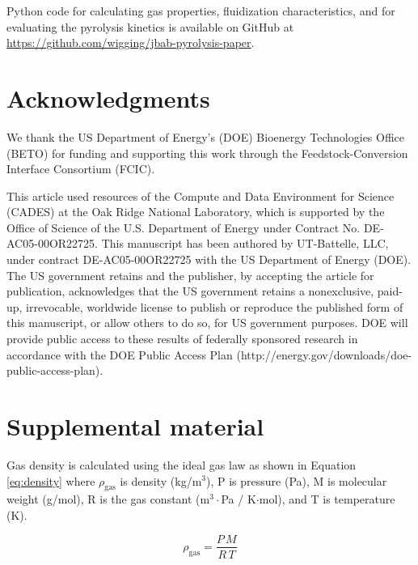 \documentclass{article}
\begin{document}
Python code for calculating gas properties, fluidization characteristics, and for evaluating the pyrolysis kinetics is available on GitHub at \url{https://github.com/wigging/jbab-pyrolysis-paper}.


\section{Acknowledgments}

We thank the US Department of Energy’s (DOE) Bioenergy Technologies Office (BETO) for funding and supporting this work through the Feedstock-Conversion Interface Consortium (FCIC).

This article used resources of the Compute and Data Environment for Science (CADES) at the Oak Ridge National Laboratory, which is supported by the Office of Science of the U.S. Department of Energy under Contract No. DE-AC05-00OR22725. This manuscript has been authored by UT-Battelle, LLC, under contract DE-AC05-00OR22725 with the US Department of Energy (DOE). The US government retains and the publisher, by accepting the article for publication, acknowledges that the US government retains a nonexclusive, paid-up, irrevocable, worldwide license to publish or reproduce the published form of this manuscript, or allow others to do so, for US government purposes. DOE will provide public access to these results of federally sponsored research in accordance with the DOE Public Access Plan (http://energy.gov/downloads/doe-public-access-plan).


\section{Supplemental material}

Gas density is calculated using the ideal gas law as shown in Equation \ref{eq:density} where $\rho_\text{gas}$ is density (kg/m$^3$), P is pressure (Pa), M is molecular weight (g/mol), R is the gas constant (m$^3\cdot$Pa / K$\cdot$mol), and T is temperature (K).

\begin{equation}\label{eq:density}
    \rho_\text{gas} = \frac{P\,M}{R\,T}
\end{equation}
\end{document}
